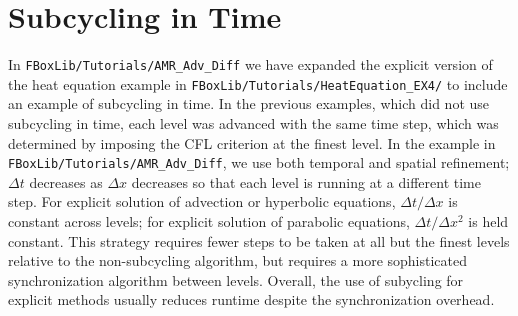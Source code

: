 \section{Subcycling in Time}\label{Sec:Subcycling}
In {\tt FBoxLib/Tutorials/AMR\_Adv\_Diff} we have expanded the
explicit version of the heat equation example in 
{\tt FBoxLib/Tutorials/HeatEquation\_EX4/} to include an example of
subcycling in time.  In the previous examples, which did not use
subcycling in time, each level was advanced with the same time step,
which was determined by imposing the CFL criterion at the finest
level.  In the example in {\tt FBoxLib/Tutorials/AMR\_Adv\_Diff},
we use both temporal and spatial refinement; 
$\Delta t$ decreases as $\Delta x$ decreases so
that each level is running at a different time step.  For explicit
solution of advection or hyperbolic equations, $\Delta t / \Delta x$
is constant across levels; for explicit solution of parabolic equations, 
$\Delta t / \Delta x^2$ is held constant.  This strategy
requires fewer steps to be taken at all but the finest levels relative
to the non-subcycling algorithm, but requires a more sophisticated
synchronization algorithm between levels.  Overall, the use of
subycling for explicit methods usually reduces runtime despite the
synchronization overhead.

